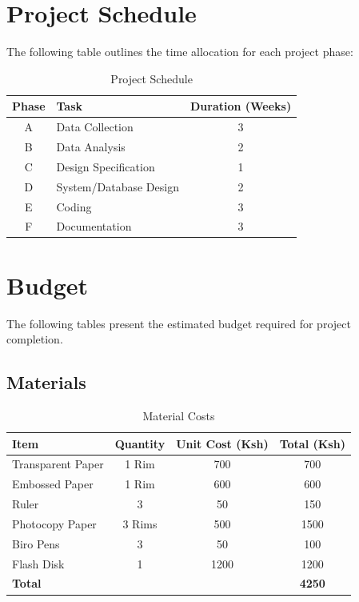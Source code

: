 \documentclass[a4paper,12pt]{report}
\begin{document}
\section{Project Schedule}
The following table outlines the time allocation for each project phase:

\begin{table}[h!]
    \centering
    \begin{tabular}{|c|l|c|}
        \hline
        \textbf{Phase} & \textbf{Task} & \textbf{Duration (Weeks)} \\
        \hline
        A & Data Collection & 3 \\
        B & Data Analysis & 2 \\
        C & Design Specification & 1 \\
        D & System/Database Design & 2 \\
        E & Coding & 3 \\
        F & Documentation & 3 \\
        \hline
    \end{tabular}
    \caption{Project Schedule}
    \label{table:schedule}
\end{table}

\section{Budget}
The following tables present the estimated budget required for project completion.

\subsection*{Materials}
\begin{table}[h!]
    \centering
    \begin{tabular}{|l|c|c|c|}
        \hline
        \textbf{Item} & \textbf{Quantity} & \textbf{Unit Cost (Ksh)} & \textbf{Total (Ksh)} \\
        \hline
        Transparent Paper & 1 Rim & 700 & 700 \\
        Embossed Paper & 1 Rim & 600 & 600 \\
        Ruler & 3 & 50 & 150 \\
        Photocopy Paper & 3 Rims & 500 & 1500 \\
        Biro Pens & 3 & 50 & 100 \\
        Flash Disk & 1 & 1200 & 1200 \\
        \hline
        \textbf{Total} & & & \textbf{4250} \\
        \hline
    \end{tabular}
    \caption{Material Costs}
    \label{table:material_costs}
\end{table}
\end{document}
